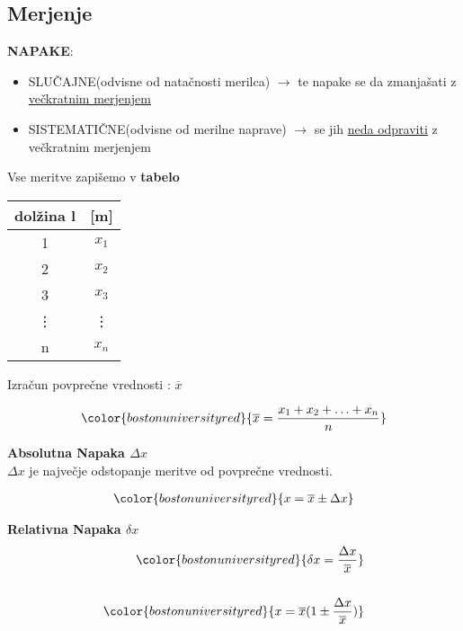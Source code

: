 {\color{indiagreen}\subsection{Merjenje}}
\textbf{NAPAKE}:
\begin{itemize}
	\item SLUČAJNE(odvisne od natačnosti merilca) $\rightarrow$ te napake se da zmanjašati z \underline{večkratnim merjenjem}
	\item SISTEMATIČNE(odvisne od merilne naprave) $\rightarrow$ se jih \underline{neda odpraviti} z večkratnim merjenjem
\end{itemize}

Vse meritve zapišemo v \textbf{tabelo}

\begin{center}
	\begin{tabular}{|c c|}
		\hline 
		dolžina l & [m]\\
	 	\hline
	 	1 & $x_1$\\
	 	2 & $x_2$\\
	 	3 & $x_3$\\
	 	\vdots & \vdots\\
	 	n & $x_n$\\
	 	\hline
 	\end{tabular}
\end{center}

Izračun povprečne vrednosti : $\overline{x}$

\begin{align*}
	{\color{bostonuniversityred}{\overline{x} = \frac{x_1 + x_2 + \ldots + x_n}{n}}}
\end{align*}

\textbf{Absolutna Napaka $\Delta x$}\\

$\Delta x$ je največje odstopanje meritve od povprečne vrednosti.

\begin{align*}
	{\color{bostonuniversityred}{x = \overline{x} \pm \Delta x}}
\end{align*}

\textbf{Relativna Napaka $\delta x$}\\

\begin{align*}
	{\color{bostonuniversityred}{\delta x =\frac{\Delta x}{\overline{x}}}}\\
	\\
	{\color{bostonuniversityred}{x = \overline{x}(1 \pm \frac{\Delta x}{\overline{x}})}}
\end{align*}




